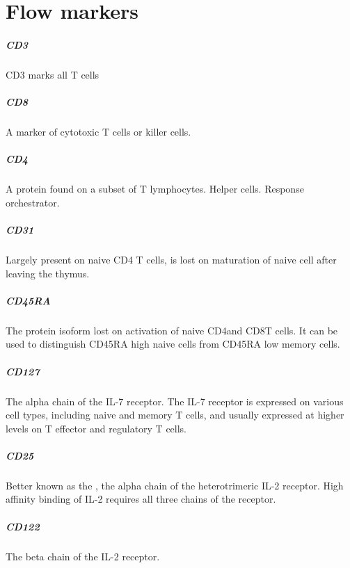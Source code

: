 \chapter{\label{appendix:flowsorting}{Flow markers}}


\paragraph{CD3}
CD3 marks all T cells

\paragraph{CD8}
A marker of cytotoxic T cells or killer cells.

\paragraph{CD4}
A protein found on a subset of T lymphocytes.
Helper cells.
Response orchestrator.

\paragraph{CD31}
Largely present on naive CD4 T cells, is lost on maturation of naive cell after leaving the thymus.

\paragraph{CD45RA}
The protein isoform lost on activation of naive CD4\positive and CD8\positive T cells.
It can be used to distinguish CD45RA high naive cells from CD45RA low memory cells.

\paragraph{CD127}
The alpha chain of the IL-7 receptor.
The IL-7 receptor is expressed on various cell types, including naive and memory T cells,
and usually expressed at higher levels on T effector and regulatory T cells.

\paragraph{CD25}
Better known as the , the alpha chain of the heterotrimeric IL-2 receptor.
High affinity binding of IL-2 requires all three chains of the receptor.

\paragraph{CD122}
The beta chain of the IL-2 receptor.

